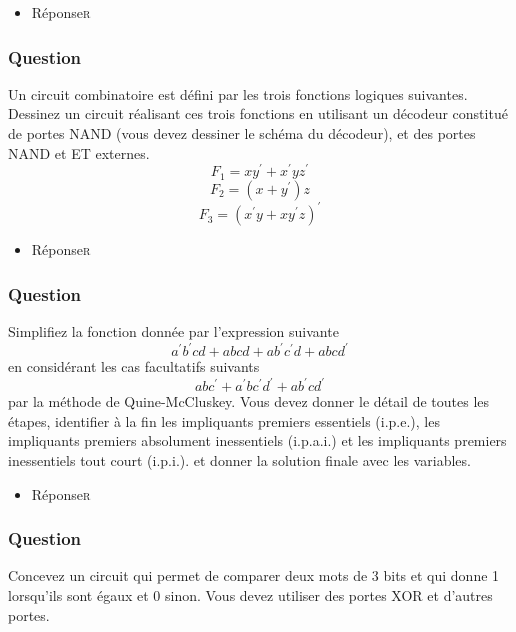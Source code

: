 \documentclass[11pt]{article}
\begin{document}
\begin{itemize}
\item Réponse\hfill{}\textsc{r}
\label{sec:org89e67e0}
\end{itemize}

\subsubsection*{Question}
\label{sec:org7f91945}
Un circuit combinatoire est défini par les trois fonctions logiques
  suivantes. Dessinez un circuit réalisant ces trois fonctions en
  utilisant un décodeur constitué de portes NAND (vous devez dessiner
  le schéma du décodeur), et des portes NAND et ET
  externes.
  $$
     F_1  = x y^{\prime} + x^{\prime}y
    z^{\prime} 
    $$
  $$
    F_2  =  (x + y^{\prime})z 
    $$
  $$ F_3  =  (x^{\prime}
    y + x y^{\prime} z)^{\prime}
    $$

\begin{itemize}
\item Réponse\hfill{}\textsc{r}
\label{sec:org3013f36}
\end{itemize}

\subsubsection*{Question}
\label{sec:org0bde2af}
Simplifiez la fonction donnée par l'expression suivante
  $$
    a^{\prime} b^{\prime} c d + a b c d + a b^{\prime} c^{\prime} d +
	a b c d^{\prime}
    $$
  en considérant les cas facultatifs suivants
  $$
    a b c^{\prime} + a^{\prime} b c^{\prime} d^{\prime} + a b^{\prime}
	c d^{\prime}
    $$
  par la méthode de Quine-McCluskey. Vous devez
  donner le détail de toutes les étapes, identifier à la fin les
  impliquants premiers essentiels (i.p.e.), les impliquants premiers
  absolument inessentiels (i.p.a.i.) et les impliquants premiers
  inessentiels tout court (i.p.i.). et donner la solution finale avec
  les variables.


\begin{itemize}
\item Réponse\hfill{}\textsc{r}
\label{sec:org27f9536}
\end{itemize}

\subsubsection*{Question}
\label{sec:org2dc539b}
Concevez un circuit qui permet de comparer deux mots de 3 bits et qui
  donne 1 lorsqu'ils sont égaux et 0 sinon. Vous devez utiliser des
  portes XOR et d'autres portes.
\end{document}
